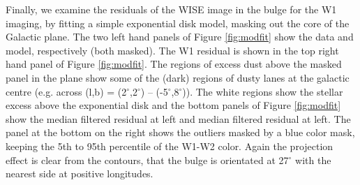 \documentclass[12pt, preprint]{aastex}
\begin{document}
Finally, we examine the residuals of the WISE image in the bulge for the W1 imaging, by fitting a simple exponential disk model, masking out the core of the Galactic plane. The two left hand panels of Figure \ref{fig:modfit} show the data and model, respectively (both masked). The W1 residual is shown in the top right hand panel of Figure \ref{fig:modfit}. The regions of excess dust above the masked panel in the plane show some of the (dark)  regions of dusty lanes at the galactic centre (e.g. across (l,b) = (2$^\circ$,2$^\circ$) -- (-5$^\circ$,8$^\circ$)). The white regions show the stellar excess above the exponential disk and the bottom panels of Figure \ref{fig:modfit} show the median filtered residual at left and median filtered residual at left. The panel at the bottom on the right shows the outliers masked by a blue color mask, keeping the 5th to 95th percentile of the W1-W2 color. Again the projection effect is clear from the contours, that the bulge is orientated at 27$^\circ$ with the nearest side at  positive longitudes. %
\end{document}
